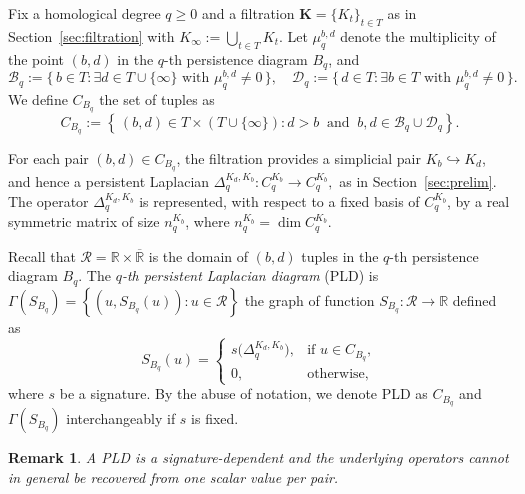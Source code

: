 \documentclass{article}
\newcommand{\R}{\mathbb{R}}
\newtheorem{remark}[theorem]{Remark}
\begin{document}
Fix a homological degree \(q\ge 0\) and a filtration \(\mathbf{K} = \{K_t\}_{t\in T}\) as in Section~\ref{sec:filtration} with $K_\infty := \bigcup_{t\in T}K_t$. 
Let \(\mu_q^{b,d}\) denote the multiplicity of the point \((b,d)\) in the \(q\)-th persistence diagram $B_q$, and  \[
\mathcal{B}_q := \{\, b \in T : \exists d\in T\cup\{\infty\} \text{ with } \mu_q^{b,d} \neq 0 \,\},
\quad
\mathcal{D}_q := \{\, d \in T : \exists b\in T \text{ with } \mu_q^{b,d} \neq 0 \,\}.
\]
We define \(C_{B_q}\) the set of tuples as
\[
C_{B_q}:= \left\{\, (b,d) \in T \times \left(T \cup \{\infty\} \right) : d>b ~\textrm{ and }~ b,d \in \mathcal{B}_q \cup \mathcal{D}_q\right\}.
\]


 

For each pair $(b,d)\in C_{B_q}$, the filtration provides a simplicial pair $
K_b \hookrightarrow K_d$,
and hence a persistent Laplacian
$\Delta^{K_d,K_b}_q : C_q^{K_b} \longrightarrow C_q^{K_b},
$ as in Section~\ref{sec:prelim}.  
The operator $\Delta^{K_d,K_b}_q$ is represented, with respect to a fixed basis of \(C_q^{K_b}\), by a real symmetric matrix of size \(n^{K_b}_q \), where \(n^{K_b}_q = \dim C_q^{K_b}\).

Recall that $\mathcal{R} = \R \times \overline{\R}$ is the domain of $(b, d)$ tuples in the $q$-th persistence diagram $B_q$. The \emph{\(q\)-th persistent Laplacian diagram} (PLD) is \(\Gamma(S_{B_q}) = \left\{(u,S_{B_q}(u)) : u \in \mathcal R\right\}\) the graph of function $S_{B_q} : \mathcal R \longrightarrow \R$ defined as
\[
S_{B_q}(u) = \begin{cases}
    s\bigl(\Delta^{K_d,K_b}_q\bigr),& \textrm{if } u \in C_{B_q}, \\
    0,& \textrm{otherwise,}
\end{cases}
\]
where $s$ be a signature. By the abuse of notation, we denote PLD as $C_{B_q}$ and $\Gamma(S_{B_q})$ interchangeably if $s$ is fixed. 

\begin{remark}
A PLD is a signature-dependent and the underlying operators cannot in general be recovered from one scalar value per pair.
\end{remark}
\end{document}
